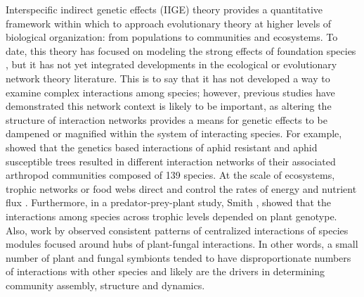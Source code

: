 \documentclass[fleqn,12pt]{olplainarticle}
\begin{document}
Interspecific indirect genetic effects (IIGE) theory provides a
quantitative framework within which to approach evolutionary theory at
higher levels of biological organization: from populations to
communities and ecosystems. To date, this theory has focused on
modeling the strong effects of foundation species
\cite{Shuster2006COMMUNITYSTRUCTURE, Whitham2012}, but it has not yet
integrated developments in the ecological or evolutionary network
theory literature. This is to say that it has not developed a way to
examine complex interactions among species; however, previous studies
have demonstrated this network context is likely to be important, as
altering the structure of interaction networks provides a means for
genetic effects to be dampened or magnified within the system of
interacting species. For example, \citep{Keith2017} showed that the
genetics based interactions of aphid resistant and aphid susceptible
trees resulted in different interaction networks of their associated
arthropod communities composed of 139 species. At the scale of
ecosystems, trophic networks or food webs direct and control the rates
of energy and nutrient flux \cite{Borgatti2006}. Furthermore, in a
predator-prey-plant study, Smith \cite{Smith2011}, showed that the
interactions among species across trophic levels depended on plant
genotype. Also, work by \citep{Toju2017, Toju2016, Toju2014a} observed
consistent patterns of centralized interactions of species modules
focused around hubs of plant-fungal interactions. In other words, a
small number of plant and fungal symbionts tended to have
disproportionate numbers of interactions with other species and likely
are the drivers in determining community assembly, structure and
dynamics.
\end{document}
